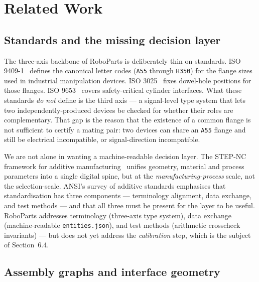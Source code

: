 \section{Related Work}

\subsection{Standards and the missing decision layer}

The three-axis backbone of RoboParts is deliberately thin on standards.
\textsc{ISO 9409-1}~\cite{iso9409} defines the canonical letter codes
(\texttt{A55} through \texttt{H350}) for the flange sizes used in
industrial manipulation devices. \textsc{ISO 3025}~\cite{iso3025}
fixes dowel-hole positions for those flanges. \textsc{ISO 9653}~\cite{iso9653}
covers safety-critical cylinder interfaces. What these standards
\emph{do not} define is the third axis — a signal-level type system
that lets two independently-produced devices be checked for whether
their roles are complementary. That gap is the reason that the
existence of a common flange is not sufficient to certify a mating
pair: two devices can share an \texttt{A55} flange and still be
electrical incompatible, or signal-direction incompatible.

We are not alone in wanting a machine-readable decision layer. The
\textsc{STEP-NC} framework for additive manufacturing~\cite{R12}
unifies geometry, material and process parameters into a single
digital spine, but at the \emph{manufacturing-process} scale, not the
selection-scale. \textsc{ANSI}'s survey of additive standards
\cite{R13} emphasises that standardisation has three components —
terminology alignment, data exchange, and test methods — and
that all three must be present for the layer to be useful. RoboParts
addresses terminology (three-axis type system), data exchange
(machine-readable \texttt{entities.json}), and test methods
(arithmetic crosscheck invariants) — but does not yet address the
\emph{calibration} step, which is the subject of Section~6.4.

\subsection{Assembly graphs and interface geometry}

